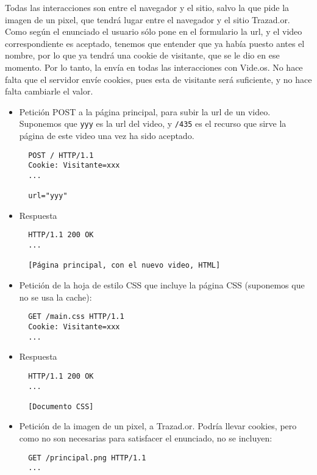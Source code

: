 Todas las interacciones son entre el navegador y el sitio, salvo la que pide la imagen de un pixel, que tendrá lugar entre el navegador y el sitio Trazad.or. Como según el enunciado el usuario sólo pone en el formulario la url, y el video correspondiente es aceptado, tenemos que entender que ya había puesto antes el nombre, por lo que ya tendrá una cookie de visitante, que se le dio en ese momento. Por lo tanto, la envía en todas las interacciones con Vide.os. No hace falta que el servidor envíe cookies, pues esta de visitante será suficiente, y no hace falta cambiarle el valor.

\begin{itemize}

\item Petición POST a la página principal, para subir la url de un video. Suponemos que \texttt{yyy} es la url del video, y \texttt{/435} es el recurso que sirve la página de este video una vez ha sido aceptado. 

\begin{verbatim}
  POST / HTTP/1.1
  Cookie: Visitante=xxx
  ...

  url="yyy"
\end{verbatim}

\item Respuesta

\begin{verbatim}
  HTTP/1.1 200 OK
  ...

  [Página principal, con el nuevo video, HTML]
\end{verbatim}

\item Petición de la hoja de estilo CSS que incluye la página CSS (suponemos que no se usa la cache):

  \begin{verbatim}
  GET /main.css HTTP/1.1
  Cookie: Visitante=xxx
  ...
\end{verbatim}

\item Respuesta

\begin{verbatim}
  HTTP/1.1 200 OK
  ...

  [Documento CSS]
\end{verbatim}

\item Petición de la imagen de un pixel, a Trazad.or. Podría llevar cookies, pero como no son necesarias para satisfacer el enunciado, no se incluyen:

  \begin{verbatim}
  GET /principal.png HTTP/1.1
  ...
\end{verbatim}


\end{itemize}
